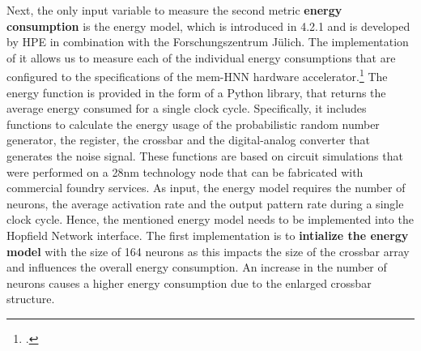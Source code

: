 Next, the only input variable to measure the second metric \textbf{energy consumption} is the energy model, which is introduced in 4.2.1 and is developed by HPE in combination with the Forschungszentrum Jülich.
The implementation of it allows us to measure each of the individual energy consumptions that are configured to the specifications of the \ac{mem-HNN} hardware accelerator.\footcite[cf.][1-5]{hizzaniMemristorbasedHardwareAlgorithms2023}
The energy function is provided in the form of a Python library, that returns the average energy consumed for a single clock cycle.
Specifically, it includes functions to calculate the energy usage of the probabilistic random number generator, the register, the crossbar and the digital-analog converter that generates the noise signal.
These functions are based on circuit simulations that were performed on a 28nm technology node that can be fabricated with commercial foundry services.
As input, the energy model requires the number of neurons, the average activation rate and the output pattern rate during a single clock cycle.
Hence, the mentioned energy model needs to be implemented into the Hopfield Network interface.
The first implementation is to \textbf{intialize the energy model} with the size of 164 neurons as this impacts the size of the crossbar array and influences the overall energy consumption.
An increase in the number of neurons causes a higher energy consumption due to the enlarged crossbar structure.

